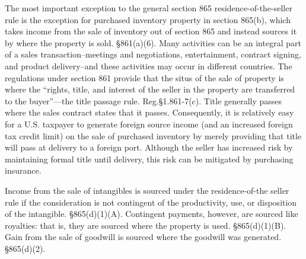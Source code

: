 The most important exception to the general section 865 residence-of-the-seller rule is the exception for purchased inventory property in section 865(b), which takes income from the sale of inventory out of section 865 and instead sources it by where the property is sold.  \S 861(a)(6).  Many activities can be an integral part of a sales transaction--meetings and negotiations, entertainment, contract signing, and product delivery--and these activities may occur in different countries.  The regulations under section 861 provide that the situs of the sale of property is where the ``rights, title, and interest of the seller in the property are transferred to the buyer''---the title passage rule.  Reg.\@ \S 1.861-7(c). Title generally passes where the sales contract states that it passes.  Consequently, it is relatively easy for a U.S. taxpayer to generate foreign source income (and an increased foreign tax credit limit) on the sale of purchased inventory by merely providing that title will pass at delivery to a foreign port.  Although the seller has increased risk by maintaining formal title until delivery, this risk can be mitigated by purchasing insurance.  

Income from the sale of intangibles is sourced under the residence-of-the seller rule if the consideration is not contingent of the productivity, use, or disposition of the intangible.  \S865(d)(1)(A).  Contingent payments, however, are sourced like royalties:  that is, they are sourced where the property is used.  \S865(d)(1)(B).  Gain from the sale of goodwill is sourced where the goodwill was generated.  \S865(d)(2).  

